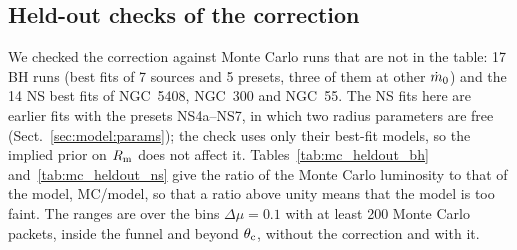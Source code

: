 \ifheldout
\subsection{Held-out checks of the correction}
\label{app:mc:heldout}

We checked the correction against Monte Carlo runs that are not in the table: 17 BH runs (best fits of 7 sources and 5 presets, three of them at other $\dot m_0$) and the 14 NS best fits of NGC~5408, NGC~300 and NGC~55.
The NS fits here are earlier fits with the presets NS4a--NS7, in which two radius parameters are free (Sect.~\ref{sec:model:params}); the check uses only their best-fit models, so the implied prior on $R_{\rm m}$ does not affect it.
Tables~\ref{tab:mc_heldout_bh} and~\ref{tab:mc_heldout_ns} give the ratio of the Monte Carlo luminosity to that of the model, MC/model, so that a ratio above unity means that the model is too faint.
The ranges are over the bins $\Delta\mu = 0.1$ with at least 200 Monte Carlo packets, inside the funnel and beyond $\theta_{\rm c}$, without the correction and with it.

